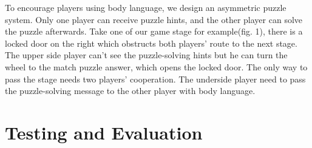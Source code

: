 \documentclass{chi-ext}
\begin{document}
To encourage players using body language, we design an asymmetric puzzle system. Only one player can receive puzzle hints, and the other player can solve the puzzle afterwards.
Take one of our game stage for example(fig. 1), there is a locked door on the right which obstructs both players' route to the next stage. 
The upper side player can't see the puzzle-solving hints but he can turn the wheel to the match puzzle answer, which opens the locked door.
The only way to pass the stage needs two players' cooperation. The underside player need to pass the puzzle-solving message to the other player with body language. 


\section{Testing and Evaluation}

\end{document}
